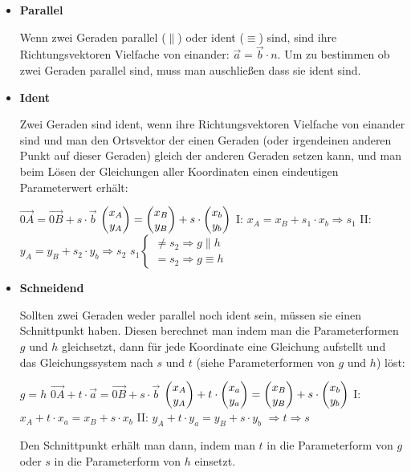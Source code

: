 \begin{itemize}
  \item \textbf{Parallel}
  \par
  Wenn zwei Geraden parallel ($\parallel$) oder ident ($\equiv$) sind, sind ihre Richtungsvektoren Vielfache von einander: $\vec{a} = \vec{b} \cdot n$. Um zu bestimmen ob zwei Geraden parallel sind, muss man auschlie\ss{}en dass sie ident sind.

\pagebreak

  \item \textbf{Ident}
  \par
  Zwei Geraden sind ident, wenn ihre Richtungsvektoren Vielfache von einander sind und man den Ortsvektor der einen Geraden (oder irgendeinen anderen Punkt auf dieser Geraden) gleich der anderen Geraden setzen kann, und man beim L\"{o}sen der Gleichungen aller Koordinaten einen eindeutigen Parameterwert erh\"{a}lt:

  \begin{center}
    $\vec{0A} = \vec{0B} + s \cdot \vec{b}$
    \extrapar
    $\begin{pmatrix}x_{A}\\y_{A}\end{pmatrix} = \begin{pmatrix}x_{B}\\y_{B}\end{pmatrix} + s \cdot \begin{pmatrix}x_{b}\\y_{b}\end{pmatrix}$
    \extrapar
    I: $x_{A} = x_{B} + s_{1} \cdot x_{b} \Rightarrow s_{1}$
    \extrapar
    II: $y_{A} = y_{B} + s_{2} \cdot y_{b} \Rightarrow s_{2}$
    \extrapar
    $
      s_{1}
      \begin{cases}
        \neq s_{2} \Rightarrow g \parallel h\\
        = s_{2} \Rightarrow g \equiv h
      \end{cases}
    $
  \end{center}

\item \textbf{Schneidend}
  \par
  Sollten zwei Geraden weder parallel noch ident sein, m\"{u}ssen sie einen Schnittpunkt haben. Diesen berechnet man indem man die Parameterformen $g$ und $h$ gleichsetzt, dann f\"{u}r jede Koordinate eine Gleichung aufstellt und das Gleichungssystem nach $s$ und $t$ (siehe Parameterformen von $g$ und $h$) l\"{o}st:

  \begin{center}
    $g = h$
    \extrapar
    $\vec{0A} + t \cdot \vec{a} = \vec{0B} + s \cdot \vec{b}$
    \extrapar
    $\begin{pmatrix}x_{A}\\y_{A}\end{pmatrix} + t \cdot \begin{pmatrix}x_{a}\\y_{a}\end{pmatrix} = \begin{pmatrix}x_{B}\\y_{B}\end{pmatrix} + s \cdot \begin{pmatrix}x_{b}\\y_{b}\end{pmatrix}$
    \extrapar
    I: $x_{A} + t \cdot x_{a} = x_{B} + s \cdot x_{b}$
    \extrapar
    II: $y_{A} + t \cdot y_{a} = y_{B} + s \cdot y_{b}$
    \extrapar
    $\Rightarrow t \Rightarrow s$
  \end{center}

  Den Schnittpunkt erh\"{a}lt man dann, indem man $t$ in die Parameterform von $g$ oder $s$ in die Parameterform von $h$ einsetzt.

\end{itemize}

